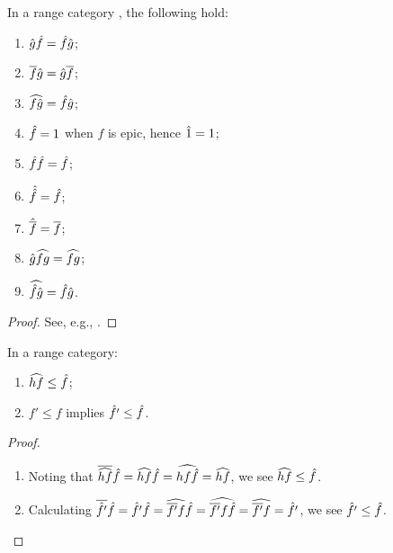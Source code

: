 \begin{lemma}\label{lem:basic_range_category_properties}
  In a range category \X, the following hold:
  \begin{multicols}{2}
    \begin{enumerate}[{(}i{)}]
      \item $\hat{g}\hat{f} = \hat{f}\hat{g}$;
      \item $\overline{f}\hat{g} = \hat{g}\overline{f}$;
      \item $\widehat{f\hat{g}} = \hat{f}\hat{g}$;
      \item $\hat{f} = 1$ when $f$ is epic, hence $\hat{1} = 1$;
      \item $\hat{f}\hat{f} = \hat{f}$;
      \item $\hat{\hat{f}} = \hat{f}$;
      \item $\hat{\overline{f}} = \overline{f}$;
      \item $\hat{g}\widehat{f g} = \widehat{f g}$;
      \item $\widehat{\hat{f}\hat{g}} = \hat{f}\hat{g}$.
    \end{enumerate}
  \end{multicols}
\end{lemma}
\begin{proof}
  See, e.g., \cite{guox:thesis}.
\end{proof}

\begin{lemma}\label{lem:ordering_of_restriction_and_range}
  In a range category:
  \begin{multicols}{2}
    \begin{enumerate}[{(}i{)}]
      \item  $\widehat{h f} \le \hat{f}$; \label{lemitem:ordering_1}
      \item $f' \le f$ implies $\hat{f'} \le \hat{f}$. \label{lemitem:ordering_2}
    \end{enumerate}
  \end{multicols}
\end{lemma}
\begin{proof}
  \prepprooflist
  \begin{enumerate}[{(}i{)}]
    \item Noting that $\overline{\widehat{hf}} \hat{f} = \widehat{hf} \hat{f}  = \widehat{hf \hat{f}} = \widehat{h f}$,
      we see $\widehat{h f} \le \hat{f}$.
    \item Calculating $\overline{\hat{f'}} \hat{f} = \hat{f'} \hat{f} = \widehat{\overline{f'} f} \hat{f} =
      \widehat{\overline{f'} f \hat{f}} = \widehat{\overline{f'} f} = \hat{f'}$, we see $\hat{f'} \le \hat{f}$.
  \end{enumerate}
\end{proof}

